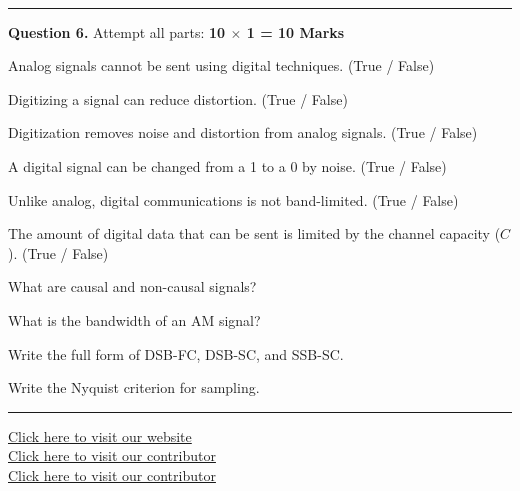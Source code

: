 \documentclass[11pt,a4paper]{article}
\begin{document}
\bigskip


\\[4pt]
\rule{\linewidth}{0.4pt}\smallskip




\noindent   \textbf{Question 6.} Attempt all parts: \hfill   \textbf{10 $ \times$ 1 = 10 Marks}

\begin{parts}
  \item Analog signals cannot be sent using digital techniques. (True / False)
  \item Digitizing a signal can reduce distortion. (True / False)
  \item Digitization removes noise and distortion from analog signals. (True / False)
  \item A digital signal can be changed from a 1 to a 0 by noise. (True / False)
  \item Unlike analog, digital communications is not band-limited. (True / False)
  \item The amount of digital data that can be sent is limited by the channel capacity ($C$). (True / False)
  \item What are causal and non-causal signals?
  \item What is the bandwidth of an AM signal?
  \item Write the full form of DSB-FC, DSB-SC, and SSB-SC.
  \item Write the Nyquist criterion for sampling.
\end{parts}

\vfill
\rule{\linewidth}{0.4pt}

\begin{center}\small
\href{https://bhu-exam.vercel.app/}{Click here to visit our website}\\[4pt]\href{https://me-aryan.vercel.app/}{Click here to visit our contributor}\\[4pt]\href{https://quashan-me.vercel.app/}{Click here to visit our contributor}
\end{center}
\end{document}
